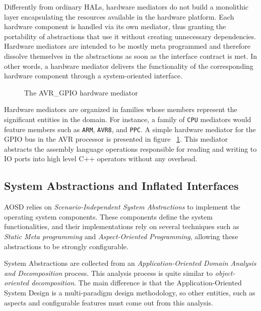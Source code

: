 Differently from ordinary \textsc{HAL}s, hardware mediators do not build
a monolithic layer encapsulating the resources available in the hardware
platform. Each hardware component is handled via its own mediator, thus
granting the portability of abstractions that use it without creating
unnecessary dependencies. Hardware mediators are intended to be
mostly meta programmed and therefore dissolve themselves in the
abstractions as soon as the interface contract is met. In other words, a
hardware mediator delivers the functionality of the corresponding
hardware component through a system-oriented interface.


\begin{figure}[htbp]
\lstset{language=c++,frame=lrtb}
\lstset{basicstyle=\ttfamily}
\lstset{commentstyle=\textit}

\caption{The AVR\_GPIO hardware mediator}
\label{fig:hm_gpio}
\end{figure}


Hardware mediators are organized in families whose 
members represent the significant entities in the domain. For
instance, a family of \texttt{CPU} mediators would feature members such
as \texttt{ARM}, \texttt{AVR8}, and \texttt{PPC}. %
A simple hardware mediator for the GPIO bus in the AVR processor
is presented in figure ~\ref{fig:hm_gpio}. This mediator abstracts
the assembly language operations responsible for
reading and writing to IO ports into high level C++ operators
without any overhead.





\subsection{System Abstractions and Inflated Interfaces}

AOSD relies on \emph{Scenario-Independent System Abstractions} to
implement the operating system components. These components define the
system functionalities, and their implementations rely on several
techniques such as \emph{Static Meta programming} and
\emph{Aspect-Oriented Programming},  allowing these abstractions 
to be strongly configurable.

System Abstractions are collected from an \emph{Application-Oriented
Domain Analysis and Decomposition} process. This analysis process is
quite similar to \emph{object-oriented decomposition}. The main
difference is that the Application-Oriented System Design is a
multi-paradigm design methodology, so other entities, such as aspects
and configurable features must come out from this analysis.

